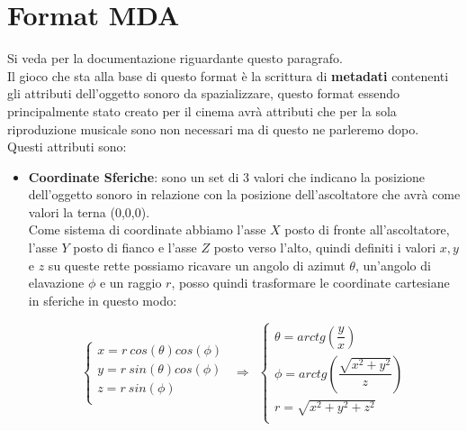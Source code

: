 \documentclass[12pt,a4paper]{report}
\begin{document}
\section{Format MDA}

Si veda \cite{mda} per la documentazione riguardante questo paragrafo.\\

Il gioco che sta alla base di questo format è la scrittura di \textbf{metadati} contenenti gli attributi dell'oggetto sonoro da spazializzare, questo format essendo principalmente stato creato per il cinema avrà attributi che per la sola riproduzione musicale sono non necessari ma di questo ne parleremo dopo.\\

Questi attributi sono:
\begin{itemize}\label{aaa}
\item \textbf{Coordinate Sferiche}: sono un set di 3 valori che indicano la posizione dell'oggetto sonoro in relazione con la posizione dell'ascoltatore che avrà come valori la terna (0,0,0).\\

Come sistema di coordinate abbiamo l'asse $X$ posto di fronte all'ascoltatore, l'asse $Y$ posto di fianco e l'asse $Z$ posto verso l'alto, quindi definiti i valori $x,y$ e $z$ su queste rette possiamo ricavare un angolo di azimut $\theta$, un'angolo di elavazione $\phi$ e un raggio $r$, posso quindi trasformare le coordinate cartesiane in sferiche in questo modo:

\begin{equation}
	\left\{\begin{matrix}
x= r\ cos(\theta) cos(\phi) \\
y= r\ sin(\theta) cos(\phi)\\
z= r\ sin(\phi)\\
\end{matrix}\right. \ \ \Rightarrow \ \  \left\{\begin{matrix}
\theta = arctg \left(\dfrac{y}{x} \right) \\
\phi   = arctg \left(\dfrac{\sqrt{x^2 + y^2 }}{z} \right) \\
r = \sqrt{x^2 +y^2 +z^2 }\\
\end{matrix}\right.
	\label{eq:coordinatepolari}
\end{equation}


\end{itemize}
\end{document}
